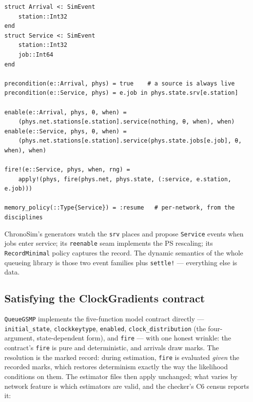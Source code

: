 \documentclass[11pt]{article}
\newcommand{\code}[1]{\texttt{#1}}
\begin{document}
\begin{lstlisting}
struct Arrival <: SimEvent
    station::Int32
end
struct Service <: SimEvent
    station::Int32
    job::Int64
end

precondition(e::Arrival, phys) = true    # a source is always live
precondition(e::Service, phys) = e.job in phys.state.srv[e.station]

enable(e::Arrival, phys, θ, when) =
    (phys.net.stations[e.station].service(nothing, θ, when), when)
enable(e::Service, phys, θ, when) =
    (phys.net.stations[e.station].service(phys.state.jobs[e.job], θ, when), when)

fire!(e::Service, phys, when, rng) =
    apply!(phys, fire(phys.net, phys.state, (:service, e.station, e.job)))

memory_policy(::Type{Service}) = :resume   # per-network, from the disciplines
\end{lstlisting}

ChronoSim's generators watch the \code{srv} places and propose \code{Service}
events when jobs enter service; its \code{reenable} seam implements the PS
rescaling; its \code{RecordMinimal} policy captures the record. The dynamic
semantics of the whole queueing library is those two event families plus
\code{settle!} --- everything else is data.

\subsection{Satisfying the ClockGradients contract}
\label{sec:estimators}

\code{QueueGSMP} implements the five-function model contract directly ---
\code{initial\_state}, \code{clockkeytype}, \code{enabled},
\code{clock\_distribution} (the four-argument, state-dependent form), and
\code{fire} --- with one honest wrinkle: the contract's \code{fire} is pure
and deterministic, and arrivals draw marks. The resolution is the marked
record: during estimation, \code{fire} is evaluated \emph{given} the recorded
marks, which restores determinism exactly the way the likelihood conditions on
them. The estimator files then apply unchanged; what varies by network feature
is which estimators are valid, and the checker's C6 census reports it:
\end{document}
